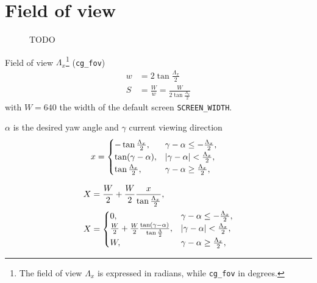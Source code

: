 \section{Field of view}
\label{app:fov}

\begin{figure}[H]
	\centering
	\begin{subfigure}[t]{.5\textwidth}
		\centering
		\setlength\figureheight{5.5cm} 
		\setlength\figurewidth{5.5cm}
		\caption{}
	\end{subfigure}%
	\begin{subfigure}[t]{.5\textwidth}
		\centering
		\setlength\figureheight{5.5cm} 
		\setlength\figurewidth{5.5cm}
		\caption{}
	\end{subfigure}%
	\caption{TODO}
	\label{fig:fov}
\end{figure}
Field of view $\Lambda_x$\footnote{The field of view $\Lambda_x$ is expressed in radians, while \texttt{cg\_fov} in degrees.} (\texttt{cg\_fov})
\begin{align*}
w &= 2\tan\frac{\Lambda_x}{2}\\
S &= \frac{W}{w} = \frac{W}{2\tan\frac{\Lambda_x}{2}}
\end{align*}
with $W = 640$ the width of the default screen \texttt{SCREEN\_WIDTH}.

$\alpha$ is the desired yaw angle and $\gamma$ current viewing direction
\begin{align*}
x &=
\begin{cases}
-\tan\frac{\Lambda_x}{2}, & \gamma - \alpha  \le -\frac{\Lambda_x}{2}, \\
\tan(\gamma - \alpha), & \left\lvert\gamma - \alpha\right\rvert < \frac{\Lambda_x}{2},\\
\tan\frac{\Lambda_x}{2}, & \gamma - \alpha \ge \frac{\Lambda_x}{2},
\end{cases}
\end{align*}

\begin{align*}
X &= \frac{W}{2} + \frac{W}{2}\frac{x}{\tan\frac{\Lambda_x}{2}},\\
X &=
\begin{cases}
0, & \gamma - \alpha  \le -\frac{\Lambda_x}{2}, \\
\frac{W}{2} + \frac{W}{2}\frac{\tan(\gamma - \alpha)}{\tan\frac{\Lambda}{2}}, & \left\lvert\gamma - \alpha\right\rvert < \frac{\Lambda_x}{2},\\
W, & \gamma - \alpha \ge \frac{\Lambda_x}{2},
\end{cases}                                 
\end{align*}

